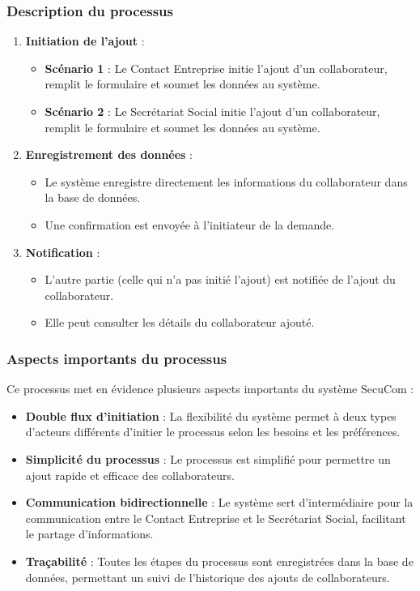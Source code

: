 \subsubsection{Description du processus}

\begin{enumerate}
  \item \textbf{Initiation de l'ajout} :
    \begin{itemize}
      \item \textbf{Scénario 1} : Le Contact Entreprise initie l'ajout d'un collaborateur, remplit le formulaire et soumet les données au système.
      \item \textbf{Scénario 2} : Le Secrétariat Social initie l'ajout d'un collaborateur, remplit le formulaire et soumet les données au système.
    \end{itemize}

  \item \textbf{Enregistrement des données} :
    \begin{itemize}
      \item Le système enregistre directement les informations du collaborateur dans la base de données.
      \item Une confirmation est envoyée à l'initiateur de la demande.
    \end{itemize}

  \item \textbf{Notification} :
    \begin{itemize}
      \item L'autre partie (celle qui n'a pas initié l'ajout) est notifiée de l'ajout du collaborateur.
      \item Elle peut consulter les détails du collaborateur ajouté.
    \end{itemize}
\end{enumerate}

\subsubsection{Aspects importants du processus}

Ce processus met en évidence plusieurs aspects importants du système SecuCom :

\begin{itemize}
  \item \textbf{Double flux d'initiation} : La flexibilité du système permet à deux types d'acteurs différents d'initier le processus selon les besoins et les préférences.
  \item \textbf{Simplicité du processus} : Le processus est simplifié pour permettre un ajout rapide et efficace des collaborateurs.
  \item \textbf{Communication bidirectionnelle} : Le système sert d'intermédiaire pour la communication entre le Contact Entreprise et le Secrétariat Social, facilitant le partage d'informations.
  \item \textbf{Traçabilité} : Toutes les étapes du processus sont enregistrées dans la base de données, permettant un suivi de l'historique des ajouts de collaborateurs.
\end{itemize}

